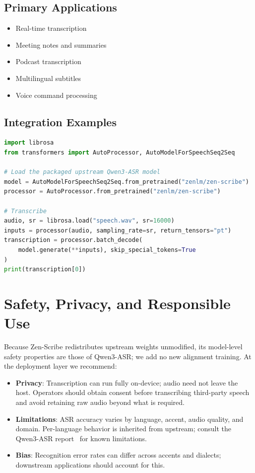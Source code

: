\documentclass[11pt,a4paper]{article}
\begin{document}
\subsection{Primary Applications}
\begin{itemize}
\item Real-time transcription
\item Meeting notes and summaries
\item Podcast transcription
\item Multilingual subtitles
\item Voice command processing
\end{itemize}

\subsection{Integration Examples}

\begin{lstlisting}[language=Python, caption=Basic Usage Example (loads the upstream Qwen3-ASR weights repackaged by Zen-Scribe)]
import librosa
from transformers import AutoProcessor, AutoModelForSpeechSeq2Seq

# Load the packaged upstream Qwen3-ASR model
model = AutoModelForSpeechSeq2Seq.from_pretrained("zenlm/zen-scribe")
processor = AutoProcessor.from_pretrained("zenlm/zen-scribe")

# Transcribe
audio, sr = librosa.load("speech.wav", sr=16000)
inputs = processor(audio, sampling_rate=sr, return_tensors="pt")
transcription = processor.batch_decode(
    model.generate(**inputs), skip_special_tokens=True
)
print(transcription[0])
\end{lstlisting}

\section{Safety, Privacy, and Responsible Use}

Because Zen-Scribe redistributes upstream weights unmodified, its model-level safety
properties are those of Qwen3-ASR; we add no new alignment training. At the
deployment layer we recommend:
\begin{itemize}
    \item \textbf{Privacy}: Transcription can run fully on-device; audio need not leave
          the host. Operators should obtain consent before transcribing third-party
          speech and avoid retaining raw audio beyond what is required.
    \item \textbf{Limitations}: ASR accuracy varies by language, accent, audio quality,
          and domain. Per-language behavior is inherited from upstream; consult the
          Qwen3-ASR report~\cite{qwen3asr} for known limitations.
    \item \textbf{Bias}: Recognition error rates can differ across accents and
          dialects; downstream applications should account for this.
\end{itemize}
\end{document}
